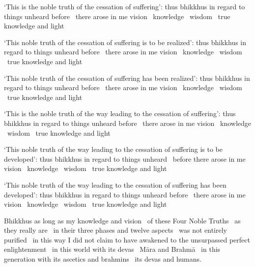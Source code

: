 \begin{english-only-hang}
  `This is the noble truth of the cessation of suffering': thus bhikkhus in regard to things unheard before \breathmark\ there arose in me vision \breathmark\ knowledge \breathmark\ wisdom \breathmark\ true knowledge and light
\end{english-only-hang}

\begin{english-only-hang}
  `This noble truth of the cessation of suffering is to be realized': thus bhikkhus in regard to things unheard before \breathmark\ there arose in me vision \breathmark\ knowledge \breathmark\ wisdom \breathmark\ true knowledge and light
\end{english-only-hang}

\begin{english-only-hang}
  `This noble truth of the cessation of suffering has been realized': thus bhikkhus in regard to things unheard before \breathmark\ there arose in me vision \breathmark\ knowledge \breathmark\ wisdom \breathmark\ true knowledge and light
\end{english-only-hang}

\begin{english-only-hang}
  `This is the noble truth of the way leading to the cessation of suffering': thus bhikkhus in regard to things unheard before \breathmark\ there arose in me vision \breathmark\ knowledge \breathmark\ wisdom \breathmark\ true knowledge and light
\end{english-only-hang}

\begin{english-only-hang}
  `This noble truth of the way leading to the cessation of suffering is to be developed': thus bhikkhus in regard to things unheard \breathmark\ before there arose in me vision \breathmark\ knowledge \breathmark\ wisdom \breathmark\ true knowledge and light
\end{english-only-hang}

\begin{english-only-hang}
  `This noble truth of the way leading to the cessation of suffering has been developed': thus bhikkhus in regard to things unheard before \breathmark\ there arose in me vision \breathmark\ knowledge \breathmark\ wisdom \breathmark\ true knowledge and light
\end{english-only-hang}

\begin{english-only-hang}
  Bhikkhus as long as my knowledge and vision \breathmark\ of these Four Noble Truths \breathmark\ as they really are \breathmark\ in their three phases and twelve aspects \breathmark\ was not entirely purified \breathmark\ in this way I did not claim to have awakened to the unsurpassed perfect enlightenment \breathmark\ in this world with its devas \breathmark\ Māra and Brahmā \breathmark\ in this generation with its ascetics and brahmins \breathmark\ its devas and humans.
\end{english-only-hang}

